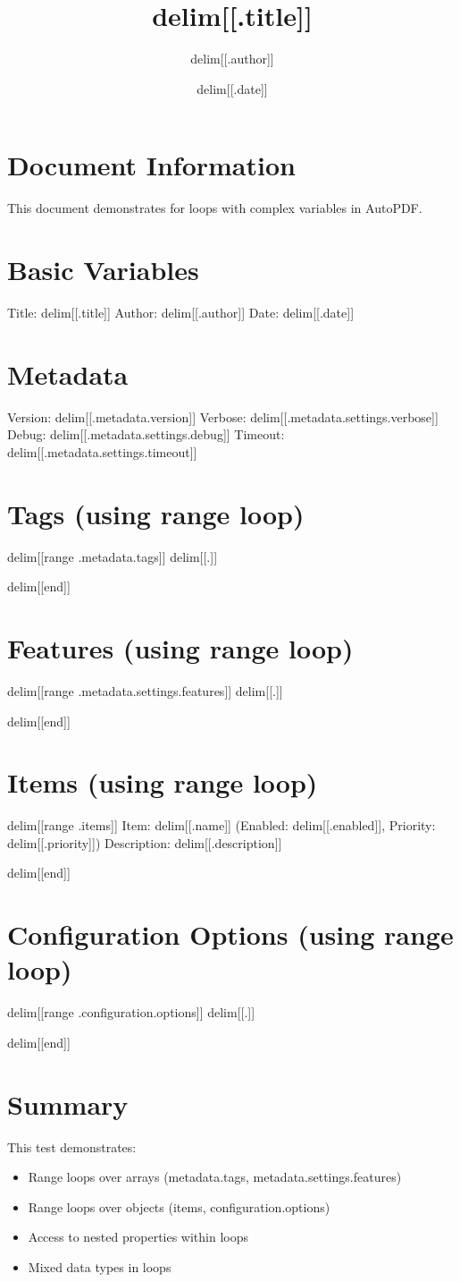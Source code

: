 \documentclass{article}
\title{delim[[.title]]}
\author{delim[[.author]]}
\date{delim[[.date]]}
\begin{document}
\maketitle

\section{Document Information}
This document demonstrates for loops with complex variables in AutoPDF.

\section{Basic Variables}
Title: delim[[.title]]
Author: delim[[.author]]
Date: delim[[.date]]

\section{Metadata}
Version: delim[[.metadata.version]]
Verbose: delim[[.metadata.settings.verbose]]
Debug: delim[[.metadata.settings.debug]]
Timeout: delim[[.metadata.settings.timeout]]

\section{Tags (using range loop)}
delim[[range .metadata.tags]]
delim[[.]]\par
delim[[end]]

\section{Features (using range loop)}
delim[[range .metadata.settings.features]]
delim[[.]]\par
delim[[end]]

\section{Items (using range loop)}
delim[[range .items]]
Item: delim[[.name]] (Enabled: delim[[.enabled]], Priority: delim[[.priority]])
Description: delim[[.description]]\par
delim[[end]]

\section{Configuration Options (using range loop)}
delim[[range .configuration.options]]
delim[[.]]\par
delim[[end]]

\section{Summary}
This test demonstrates:
\begin{itemize}
\item Range loops over arrays (metadata.tags, metadata.settings.features)
\item Range loops over objects (items, configuration.options)
\item Access to nested properties within loops
\item Mixed data types in loops
\end{itemize}
\end{document}
